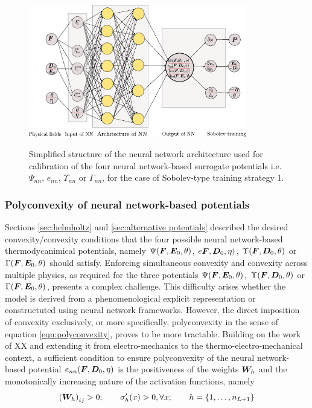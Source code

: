 \begin{figure}[htpb!]
	\centering
	\includegraphics[width=0.85\textwidth]{Figures/InkScape/NN_1}\\
	\vspace{-2mm}
	\caption{Simplified structure of the neural network architecture used for calibration of the four neural network-based surrogate potentials i.e. $\Psi_{nn}$, $e_{nn}$, $\Upsilon_{nn}$ or $\Gamma_{nn}$, for the case of Sobolev-type training strategy 1.}
	\label{fig:strategy 1}
\end{figure}


\subsubsection{Polyconvexity of neural network-based potentials}

Sections \ref{sec:helmholtz} and \ref{sec:alternative potentials} described the desired convexity/convexity conditions that the four possible neural network-based thermodycanimical potentials, namely $\Psi(\boldsymbol{F},\boldsymbol{E}_0,\theta)$, $e\boldsymbol{F},\boldsymbol{D}_0,\eta)$, $\Upsilon(\boldsymbol{F},\boldsymbol{D}_0,\theta)$ or $\Gamma(\boldsymbol{F},\boldsymbol{E}_0,\theta)$ should satisfy. 
Enforcing simultaneous convexity and convexity across multiple physics, as required for the three potentials $\Psi(\boldsymbol{F},\boldsymbol{E}_0,\theta)$,  $\Upsilon(\boldsymbol{F},\boldsymbol{D}_0,\theta)$ or $\Gamma(\boldsymbol{F},\boldsymbol{E}_0,\theta)$, presents a complex challenge. This difficulty arises whether the model is derived from a phenomenological explicit representation or constructuted using neural network frameworks. However, the direct imposition of convexity exclusively, or more specifically, polyconvexity in the sense of equation \eqref{eqn:polyconvexity}, proves to be more tractable. Building on the work of XX and extending it from electro-mechanics to the thermo-electro-mechanical context, a sufficient condition to ensure polyconvexity of the neural network-based potential $e_{nn}(\boldsymbol{F},\boldsymbol{D}_0,\eta)$ is the positiveness of the weights $\boldsymbol{W}_{h}$ and the monotonically increasing nature of the activation functions, namely
%
\begin{equation}
	\left(\boldsymbol{W}_h\right)_{ij}>0;\qquad \sigma^{\prime}_h(x)>0,\forall x;\qquad  h=\left\{1,\dots,n_{L+1}\right\}
\end{equation}

